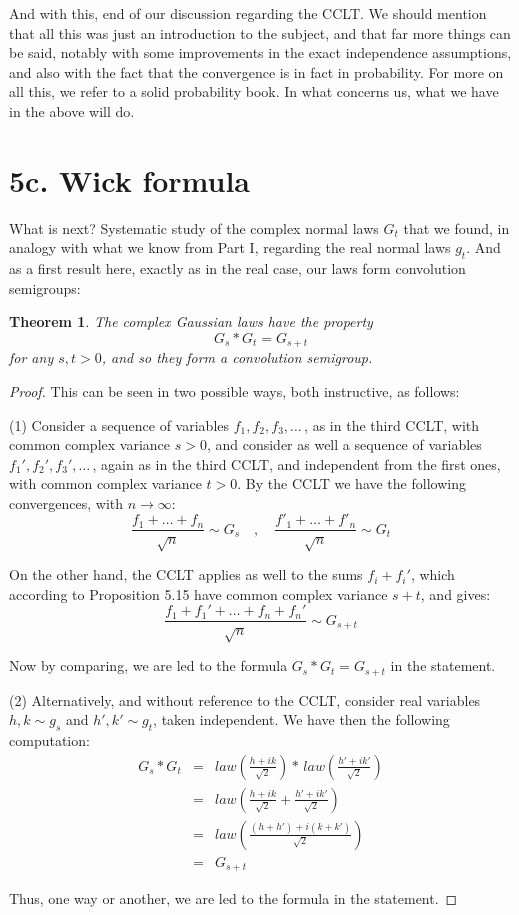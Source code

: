 \documentclass[12pt]{amsbook}
\newtheorem{theorem}{Theorem}[chapter]
\begin{document}
And with this, end of our discussion regarding the CCLT. We should mention that all this was just an introduction to the subject, and that far more things can be said, notably with some improvements in the exact independence assumptions, and also with the fact that the convergence is in fact in probability. For more on all this, we refer to a solid probability book. In what concerns us, what we have in the above will do.

\section*{5c. Wick formula}

What is next? Systematic study of the complex normal laws $G_t$ that we found, in analogy with what we know from Part I, regarding the real normal laws $g_t$. And as a first result here, exactly as in the real case, our laws form convolution semigroups:


\begin{theorem}
The complex Gaussian laws have the property
$$G_s*G_t=G_{s+t}$$
for any $s,t>0$, and so they form a convolution semigroup.
\end{theorem}

\begin{proof}
This can be seen in two possible ways, both instructive, as follows:

\medskip

(1) Consider a sequence of variables $f_1,f_2,f_3,\ldots\,$, as in the third CCLT, with common complex variance $s>0$, and consider as well a sequence of variables $f_1',f_2',f_3',\ldots\,$, again as in the third CCLT, and independent from the first ones, with common complex variance $t>0$. By the CCLT we have the following convergences, with $n\to\infty$:
$$\frac{f_1+\ldots+f_n}{\sqrt{n}}\sim G_s\quad,\quad 
\frac{f'_1+\ldots+f'_n}{\sqrt{n}}\sim G_t$$

On the other hand, the CCLT applies as well to the sums $f_i+f_i'$, which according to Proposition 5.15 have common complex variance $s+t$, and gives:
$$\frac{f_1+f_1'+\ldots+f_n+f_n'}{\sqrt{n}}\sim G_{s+t}$$

Now by comparing, we are led to the formula $G_s*G_t=G_{s+t}$ in the statement.

\medskip

(2) Alternatively, and without reference to the CCLT, consider real variables $h,k\sim g_s$ and $h',k'\sim g_t$, taken independent. We have then the following computation:
\begin{eqnarray*}
G_s*G_t
&=&law\left(\frac{h+ik}{\sqrt{2}}\right)*\,law\left(\frac{h'+ik'}{\sqrt{2}}\right)\\
&=&law\left(\frac{h+ik}{\sqrt{2}}+\frac{h'+ik'}{\sqrt{2}}\right)\\
&=&law\left(\frac{(h+h')+i(k+k')}{\sqrt{2}}\right)\\
&=&G_{s+t}
\end{eqnarray*}

Thus, one way or another, we are led to the formula in the statement.
\end{proof}
\end{document}
